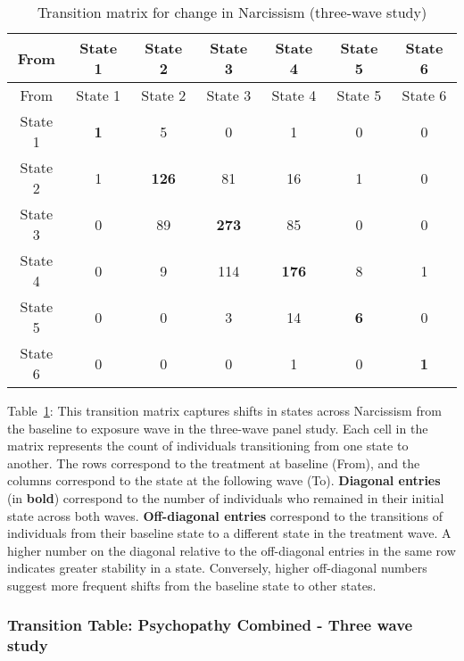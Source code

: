 \documentclass[
  single column]{article}
\begin{document}
\begin{longtable}[]{@{}ccccccc@{}}
\caption{Transition matrix for change in Narcissism (three-wave
study)}\label{tbl-table-transition-narcissism}\tabularnewline
\toprule\noalign{}
From & State 1 & State 2 & State 3 & State 4 & State 5 & State 6 \\
\midrule\noalign{}
\endfirsthead
\toprule\noalign{}
From & State 1 & State 2 & State 3 & State 4 & State 5 & State 6 \\
\midrule\noalign{}
\endhead
\bottomrule\noalign{}
\endlastfoot
State 1 & \textbf{1} & 5 & 0 & 1 & 0 & 0 \\
State 2 & 1 & \textbf{126} & 81 & 16 & 1 & 0 \\
State 3 & 0 & 89 & \textbf{273} & 85 & 0 & 0 \\
State 4 & 0 & 9 & 114 & \textbf{176} & 8 & 1 \\
State 5 & 0 & 0 & 3 & 14 & \textbf{6} & 0 \\
State 6 & 0 & 0 & 0 & 1 & 0 & \textbf{1} \\
\end{longtable}

Table~\ref{tbl-table-transition-narcissism}: This transition matrix
captures shifts in states across Narcissism from the baseline to
exposure wave in the three-wave panel study. Each cell in the matrix
represents the count of individuals transitioning from one state to
another. The rows correspond to the treatment at baseline (From), and
the columns correspond to the state at the following wave (To).
\textbf{Diagonal entries} (in \textbf{bold}) correspond to the number of
individuals who remained in their initial state across both waves.
\textbf{Off-diagonal entries} correspond to the transitions of
individuals from their baseline state to a different state in the
treatment wave. A higher number on the diagonal relative to the
off-diagonal entries in the same row indicates greater stability in a
state. Conversely, higher off-diagonal numbers suggest more frequent
shifts from the baseline state to other states.

\subsubsection{Transition Table: Psychopathy Combined - Three wave
study}\label{transition-table-psychopathy-combined---three-wave-study}
\end{document}
